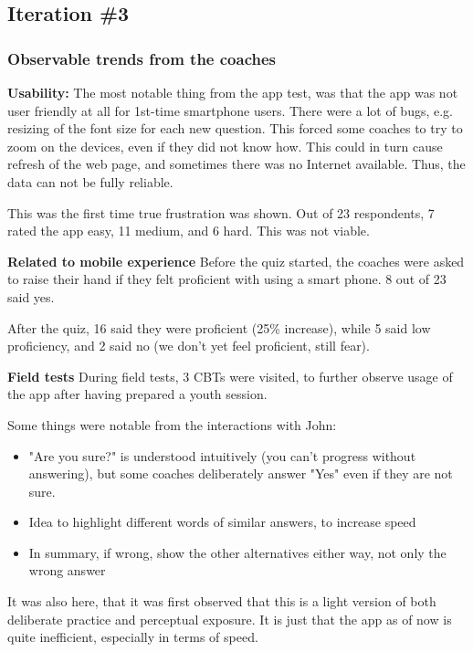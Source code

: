 \subsection{Iteration \#3}


    \subsubsection{Observable trends from the coaches}

     \textbf{Usability: } The most notable thing from the app test, was that the app was not user friendly at all for 1st-time smartphone users. There were a lot of bugs, e.g. resizing of the font size for each new question. This forced some coaches to try to zoom on the devices, even if they did not know how. This could in turn cause refresh of the web page, and sometimes there was no Internet available. Thus, the data can not be fully reliable.

  This was the first time true frustration was shown. Out of 23 respondents, 7 rated the app easy, 11 medium, and 6 hard. This was not viable.

    \textbf{Related to mobile experience}
    Before the quiz started, the coaches were asked to raise their hand if they felt proficient with using a smart phone. 8 out of 23 said yes.

    After the quiz, 16 said they were proficient (25\% increase), while 5 said low proficiency, and 2 said no (we don't yet feel proficient, still fear).

    \textbf{Field tests}
    During field tests, 3 CBTs were visited, to further observe usage of the app after having prepared a youth session.

    Some things were notable from the interactions with John:
    \begin{itemize}
    \item "Are you sure?" is understood intuitively (you can't progress without answering), but some coaches deliberately answer "Yes" even if they are not sure.
    \item Idea to highlight different words of similar answers, to increase speed
    \item In summary, if wrong, show the other alternatives either way, not only the wrong answer
    \end{itemize}

    It was also here, that it was first observed that this is a light version of both deliberate practice and perceptual exposure. It is just that the app as of now is quite inefficient, especially in terms of speed.

